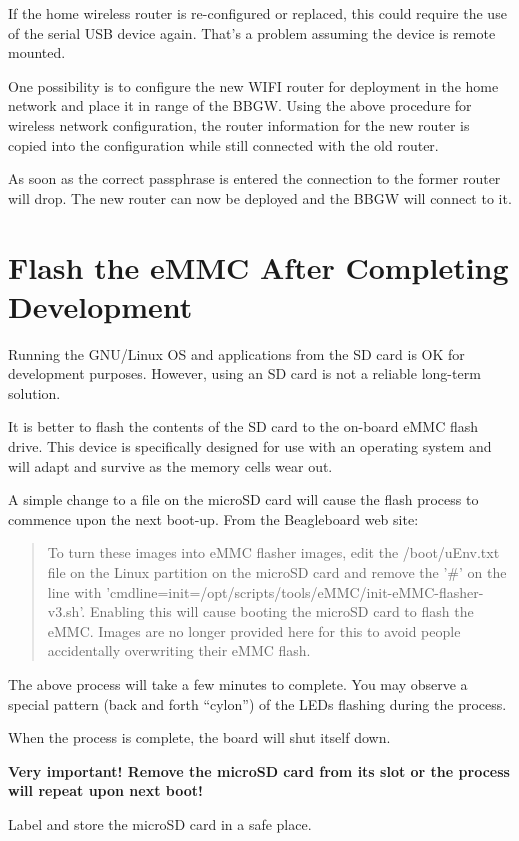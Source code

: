 If the home wireless router is re-configured or replaced, this could require 
the use of the serial USB device again.  That's a problem assuming the device 
is remote mounted.

One possibility is to configure the new WIFI router for deployment in the home 
network and place it in range of the BBGW.  Using the above procedure for 
wireless network configuration, the router information for the new router is 
copied into the configuration while still connected with the old router.

As soon as the correct passphrase is entered the connection to the former 
router will drop.  The new router can now be deployed and the BBGW will connect 
to it.

\section{Flash the eMMC After Completing Development}

Running the GNU/Linux OS and applications from the SD card is OK for 
development purposes.  However, using an SD card is not a reliable long-term 
solution.

It is better to flash the contents of the SD card to the on-board eMMC flash 
drive.  This device is specifically designed for use with an operating system 
and will adapt and survive as the memory cells wear out.

A simple change to a file on the microSD card will cause the flash process to 
commence upon the next boot-up.  From the Beagleboard web site:

\begin{quotation}
To turn these images into eMMC flasher images, edit the /boot/uEnv.txt file on 
the Linux partition on the microSD card and remove the '\#' on the line with 
'cmdline=init=/opt/scripts/tools/eMMC/init-eMMC-flasher-v3.sh'. Enabling this 
will cause booting the microSD card to flash the eMMC. Images are no longer 
provided here for this to avoid people accidentally overwriting their eMMC 
flash.
\end{quotation}

The above process will take a few minutes to complete.  You may observe a 
special pattern (back and forth ``cylon'') of the LEDs flashing during the 
process.

When the process is complete, the board will shut itself down.

\textbf{Very important!  Remove the microSD card from its slot or the process 
will repeat upon next boot!}

Label and store the microSD card in a safe place.







